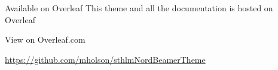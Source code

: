\documentclass[\string~/GitHub/sthlmNordBeamerTheme/sthlmNordLightDemo.tex]{subfiles}
\begin{document}
\begin{frame}[c]{Available on Overleaf}
	This theme and all the documentation is hosted on Overleaf \\
	\vspace{1em}
	\begin{center}
		\large{View on Overleaf.com}

		\url{https://github.com/mholson/sthlmNordBeamerTheme}
		\vspace{1em}


	\end{center}
\end{frame}
\end{document}

